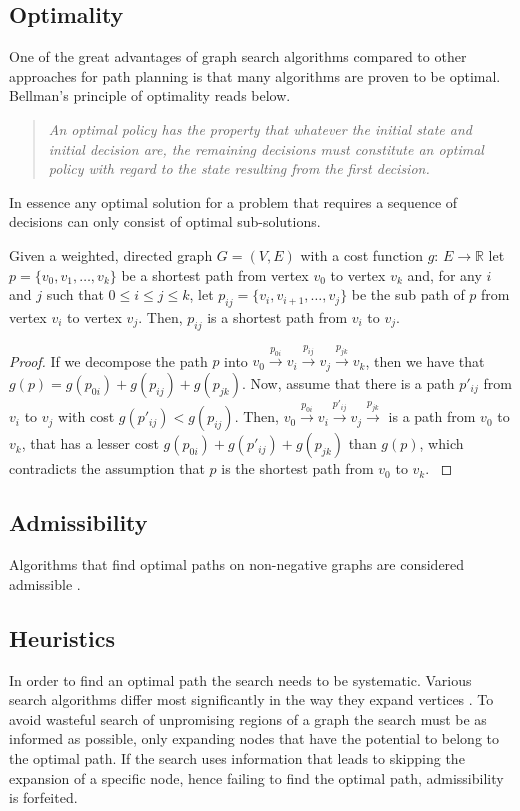 \subsection{Optimality}
One of the great advantages of graph search algorithms compared to other approaches for path planning is that many algorithms are proven to be optimal. Bellman's principle of optimality reads below.
\begin{quotation}
    \noindent \emph{An optimal policy has the property that whatever the initial state and initial decision are, the remaining decisions must constitute an optimal policy with regard to the state resulting from the first decision.} \cite{Bellman.2003}
\end{quotation}

In essence any optimal solution for a problem that requires a sequence of decisions can only consist of optimal sub-solutions.

\begin{lemma}
    Given a weighted, directed graph $G = (V,E)$ with a cost function $g$: $E \rightarrow \mathbb{R}$ let $p = \{v_0, v_1,\ldots, v_k\}$ be a shortest path from vertex $v_0$ to vertex $v_k$ and, for any $i$ and $j$ such that $0 \leq i \leq j \leq k$, let $p_{ij} = \{v_i, v_{i+1},\ldots, v_j\}$ be the sub path of $p$ from vertex $v_i$ to vertex $v_j$. Then, $p_{ij}$ is a shortest path from $v_i$ to $v_j$.
\end{lemma}
 
\begin{proof}
    If we decompose the path $p$ into $v_0 \xrightarrow{p_{0i}} v_i \xrightarrow{p_{ij}} v_j \xrightarrow{p_{jk}} v_k$, then we have that $g(p) = g(p_{0i}) + g(p_{ij}) + g(p_{jk})$. Now, assume that there is a path $p'_{ij}$ from $v_i$ to $v_j$ with cost $g(p'_{ij}) < g(p_{ij})$. Then, $v_0 \xrightarrow{p_{0i}} v_i \xrightarrow{p'_{ij}} v_j \xrightarrow{p_{jk}}$ is a path from $v_0$ to $v_k$, that has a lesser cost $g(p_{0i}) + g(p'_{ij}) + g(p_{jk})$ than $g(p)$, which contradicts the assumption that $p$ is the shortest path from $v_0$ to $v_k$. \cite{Cormen.2009}
\end{proof}

\subsection{Admissibility}
Algorithms that find optimal paths on non-negative graphs are considered admissible \cite{Hart.1968}.

\subsection{Heuristics}
In order to find an optimal path the search needs to be systematic. Various search algorithms differ most significantly in the way they expand vertices \cite{LaValle.2006}. To avoid wasteful search of unpromising regions of a graph the search must be as informed as possible, only expanding nodes that have the potential to belong to the optimal path. If the search uses information that leads to skipping the expansion of a specific node, hence failing to find the optimal path, admissibility is forfeited.

